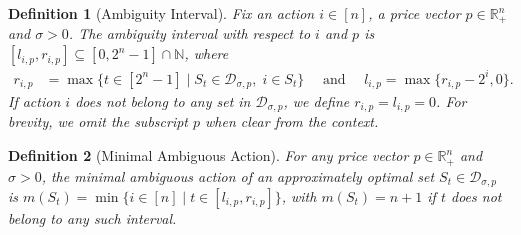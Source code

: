 \documentclass[11pt]{article}
\newtheorem{definition}{Definition}
\newcommand{\reals}{\mathbb{R}}
\newcommand{\demand}[2]{\mathcal{D}_{{#1},{#2}}}
\newcommand{\demSigP}{\demand{\sigma}{p}}
\begin{document}
\begin{definition}[Ambiguity Interval]\label{def:amgInt}
    Fix an action $i\in [n]$, a price vector $p \in \reals_{+}^n$ and $\sigma > 0$.
    The ambiguity interval with respect to $i$ and $p$ is $[l_{i,p},r_{i,p}] \subseteq [0,2^n-1]\cap \mathbb{N}$, where 
    \begin{align*}
        r_{i,p} &= \max \{t\in [2^n-1] \mid S_t \in \demSigP, \; i \in S_t\} \quad\text{ and }\quad l_{i,p} = \max\{r_{i,p} - 2^i, 0\}.
    \end{align*}
    If action $i$ does not belong to any set in $\demSigP$, we define $r_{i,p} = l_{i,p} = 0$. For brevity, we omit the subscript $p$ when clear from the context.
\end{definition}

\newcommand{\minAmb}[1]{m(#1)}
\begin{definition}[Minimal Ambiguous Action]\label{def:minAmgAction}
    For any price vector $p \in \reals_{+}^n$ and $\sigma >0$, the minimal ambiguous action of an approximately optimal set $S_t \in \demSigP$ is $\minAmb{S_t} = \min\{i \in [n] \mid t \in [l_{i,p}, r_{i,p}] \}$, with $\minAmb{S_t} = n+1$ if $t$ does not belong to any such interval.
\end{definition}
\end{document}
